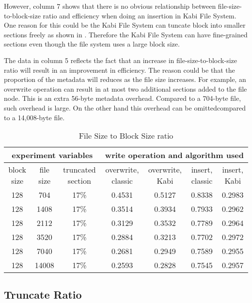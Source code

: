    However, column 7 shows that there is no obvious relationship between file-size-to-block-size ratio and efficiency when doing an insertion in Kabi File System. One reason for this could be the Kabi File System can tuncate block into smaller sections freely as shown in . Therefore the Kabi File System can have fine-grained sections even though the file system uses a large block size.
    
    The data in column 5 reflects the fact that an increase in file-size-to-block-size ratio will result in an improvement in efficiency. The reason could be that the proportion of the metadata will reduces as the file size increases. For example, an overwrite operation can result in at most two additional sections added to the file node. This is an extra 56-byte metadata overhead. Compared to a 704-byte file, such overhead is large. On the other hand this overhead can be omittedcompared to a 14,008-byte file.

\begin{lscape} 
\begin{table}
\caption{File Size to Block Size ratio}
\label{tab:fb_ratio}
\begin{center}
\begin{tabular}{|c|c|c|c|c|c|c|}
\hline
\multicolumn{3}{|c|}{experiment variables} & \multicolumn{4}{c|}{write operation and algorithm used} \\
\hline
block size & file size & truncated section & overwrite, classic & overwrite, Kabi & insert, classic & insert, Kabi\\
\hline
128 & 704 & 17\% & 0.4531 & 0.5127 & 0.8338 & 0.2983 \\
\hline
128 & 1408 & 17\% & 0.3514 & 0.3934 & 0.7933 & 0.2962 \\
\hline
128 & 2112 & 17\% & 0.3129 & 0.3532 & 0.7789 & 0.2964 \\
\hline
128 & 3520 & 17\% & 0.2884 & 0.3213 & 0.7702 & 0.2972 \\
\hline
128 & 7040 & 17\% & 0.2681 & 0.2949 & 0.7589 & 0.2955 \\
\hline
128 & 14008 & 17\% & 0.2593 & 0.2828 & 0.7545 & 0.2957 \\
\hline
\end{tabular}
\end{center}
\end{table}
\end{lscape}

\subsection{Truncate Ratio}

